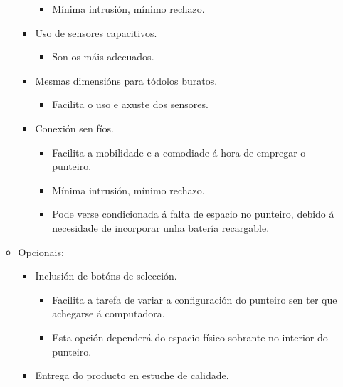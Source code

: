 \begin{itemize}
\begin{itemize}
\begin{itemize}
                       \begin{itemize}
                        \item Mínima intrusión, mínimo rechazo.
                       \end{itemize}
                 \item Uso de sensores capacitivos.
                       \begin{itemize}
                        \item Son os máis adecuados.
                       \end{itemize}
                 \item Mesmas dimensións para tódolos buratos.
                       \begin{itemize}
                        \item Facilita o uso e axuste dos sensores.
                       \end{itemize}
                 \item Conexión sen fíos.
                       \begin{itemize}
                        \item Facilita a mobilidade e a comodiade á hora de
                              empregar o punteiro.
                        \item Mínima intrusión, mínimo rechazo.
                        \item Pode verse condicionada á falta de espacio no
                              punteiro, debido á necesidade de incorporar unha
                              batería recargable.
                       \end{itemize}
                \end{itemize}
          \item Opcionais:
                \begin{itemize}
                 \item Inclusión de botóns de selección.
                       \begin{itemize}
                        \item Facilita a tarefa de variar a configuración do
                              punteiro sen ter que achegarse á computadora.
                        \item Esta opción dependerá do espacio físico sobrante
                              no interior do punteiro.
                       \end{itemize}
                 \item Entrega do producto en estuche de calidade.

\end{itemize}
\end{itemize}
\end{itemize}
